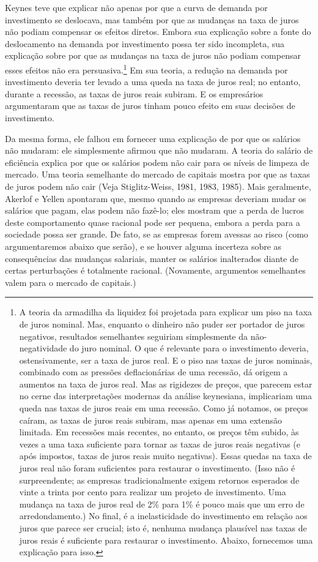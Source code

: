 \documentclass[12pt]{article}
\begin{document}
Keynes teve que explicar não apenas por que a curva de demanda por investimento se deslocava, mas também por que as mudanças na taxa de juros não podiam compensar os efeitos diretos. Embora sua explicação sobre a fonte do deslocamento na demanda por investimento possa ter sido incompleta, sua explicação sobre por que as mudanças na taxa de juros não podiam compensar esses efeitos não era persuasiva.\footnote{A teoria da armadilha da liquidez foi projetada para explicar um piso na taxa de juros nominal. Mas, enquanto o dinheiro não puder ser portador de juros negativos, resultados semelhantes seguiriam simplesmente da não-negatividade do juro nominal. O que é relevante para o investimento deveria, ostensivamente, ser a taxa de juros real. E o piso nas taxas de juros nominais, combinado com as pressões deflacionárias de uma recessão, dá origem a aumentos na taxa de juros real. Mas as rigidezes de preços, que parecem estar no cerne das interpretações modernas da análise keynesiana, implicariam uma queda nas taxas de juros reais em uma recessão. Como já notamos, os preços caíram, as taxas de juros reais subiram, mas apenas em uma extensão limitada. Em recessões mais recentes, no entanto, os preços têm subido, às vezes a uma taxa suficiente para tornar as taxas de juros reais negativas (e após impostos, taxas de juros reais muito negativas). Essas quedas na taxa de juros real não foram suficientes para restaurar o investimento. (Isso não é surpreendente; as empresas tradicionalmente exigem retornos esperados de vinte a trinta por cento para realizar um projeto de investimento. Uma mudança na taxa de juros real de 2\% para 1\% é pouco mais que um erro de arredondamento.) No final, é a inelasticidade do investimento em relação aos juros que parece ser crucial; isto é, nenhuma mudança plausível nas taxas de juros reais é suficiente para restaurar o investimento. Abaixo, fornecemos uma explicação para isso.} Em sua teoria, a redução na demanda por investimento deveria ter levado a uma queda na taxa de juros real; no entanto, durante a recessão, as taxas de juros reais subiram. E os empresários argumentaram que as taxas de juros tinham pouco efeito em suas decisões de investimento.

Da mesma forma, ele falhou em fornecer uma explicação de por que os salários não mudaram: ele simplesmente afirmou que não mudaram. A teoria do salário de eficiência explica por que os salários podem não cair para os níveis de limpeza de mercado. Uma teoria semelhante do mercado de capitais mostra por que as taxas de juros podem não cair (Veja Stiglitz-Weiss, 1981, 1983, 1985). Mais geralmente, Akerlof e Yellen apontaram que, mesmo quando as empresas deveriam mudar os salários que pagam, elas podem não fazê-lo; eles mostram que a perda de lucros deste comportamento quase racional pode ser pequena, embora a perda para a sociedade possa ser grande. De fato, se as empresas forem avessas ao risco (como argumentaremos abaixo que serão), e se houver alguma incerteza sobre as consequências das mudanças salariais, manter os salários inalterados diante de certas perturbações é totalmente racional. (Novamente, argumentos semelhantes valem para o mercado de capitais.)
\end{document}
